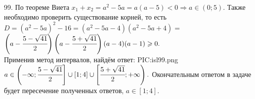 99. По теореме Виета $x_1+x_2=a^2-5a=a(a-5)<0\Rightarrow a\in(0;5).$ Также необходимо проверить существование корней, то есть $D=(a^2-5a)^2-16=
(a^2-5a-4)(a^2-5a+4)=$\\$\left(a-\cfrac{5-\sqrt{41}}{2}\right)\left(a-\cfrac{5+\sqrt{41}}{2}\right)(a-4)(a-1)\geqslant0.$\\ Применив метод интервалов, найдём ответ:
{{PIC:isl99.png}}
$a\in\left(-\infty;\cfrac{5-\sqrt{41}}{2}\right]\cup[1;4]\cup\left[\cfrac{5+\sqrt{41}}{2};+\infty\right).$
Окончательным ответом в задаче будет пересечение полученных ответов, $a\in [1;4].$\\
